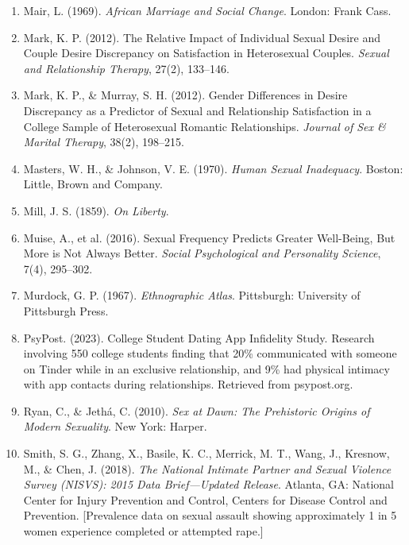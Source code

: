 \documentclass[12pt, letterpaper]{article}
\begin{document}
\begin{enumerate}
    \item Mair, L. (1969). \textit{African Marriage and Social Change}. London: Frank Cass.
    
    \item Mark, K. P. (2012). The Relative Impact of Individual Sexual Desire and Couple Desire Discrepancy on Satisfaction in Heterosexual Couples. \textit{Sexual and Relationship Therapy}, 27(2), 133--146.
    
    \item Mark, K. P., \& Murray, S. H. (2012). Gender Differences in Desire Discrepancy as a Predictor of Sexual and Relationship Satisfaction in a College Sample of Heterosexual Romantic Relationships. \textit{Journal of Sex \& Marital Therapy}, 38(2), 198--215.
    
    \item Masters, W. H., \& Johnson, V. E. (1970). \textit{Human Sexual Inadequacy}. Boston: Little, Brown and Company.
    
    \item Mill, J. S. (1859). \textit{On Liberty}.
    
    \item Muise, A., et al. (2016). Sexual Frequency Predicts Greater Well-Being, But More is Not Always Better. \textit{Social Psychological and Personality Science}, 7(4), 295--302.
    
    \item Murdock, G. P. (1967). \textit{Ethnographic Atlas}. Pittsburgh: University of Pittsburgh Press.
    
    \item PsyPost. (2023). College Student Dating App Infidelity Study. Research involving 550 college students finding that 20\% communicated with someone on Tinder while in an exclusive relationship, and 9\% had physical intimacy with app contacts during relationships. Retrieved from psypost.org.
    
    \item Ryan, C., \& Jeth\'{a}, C. (2010). \textit{Sex at Dawn: The Prehistoric Origins of Modern Sexuality}. New York: Harper.
    
    \item Smith, S. G., Zhang, X., Basile, K. C., Merrick, M. T., Wang, J., Kresnow, M., \& Chen, J. (2018). \textit{The National Intimate Partner and Sexual Violence Survey (NISVS): 2015 Data Brief---Updated Release}. Atlanta, GA: National Center for Injury Prevention and Control, Centers for Disease Control and Prevention. [Prevalence data on sexual assault showing approximately 1 in 5 women experience completed or attempted rape.]
    

\end{enumerate}
\end{document}
